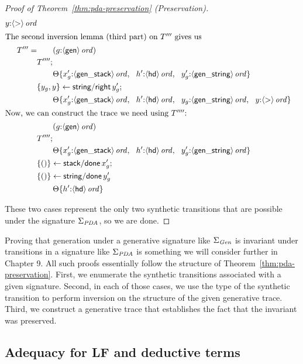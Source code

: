 \begin{proof}[Proof of Theorem~\ref{thm:pda-preservation} (Preservation)]
\begin{align*}
{                   y{:}{\langle {\sf >} \rangle}\,{{\it ord}}}\\
\intertext{The second inversion lemma (third part) on $T'''$ gives us}
T''' = & \qquad ({g{:}{\langle {\sf gen} \rangle}\,{{\it ord}}})\\
& T'''';\\
& \qquad {\Theta}\{{x_g'{:}{\langle {\sf gen\_stack} \rangle}\,{{\it ord}}, ~~
                   h'{:}{\langle {\sf hd} \rangle}\,{{\it ord}}, ~~
                   y_g'{:}{\langle {\sf gen\_string} \rangle}\,{{\it ord}}}\}\\
& \{{y_g, y}\} \leftarrow {{\sf string/right}\,y_g'};\\
& \qquad {\Theta}\{{x_g'{:}{\langle {\sf gen\_stack} \rangle}\,{{\it ord}}, ~~
                   h'{:}{\langle {\sf hd} \rangle}\,{{\it ord}}, ~~
                   y_g{:}{\langle {\sf gen\_string} \rangle}\,{{\it ord}}, ~~
                   y{:}{\langle {\sf >} \rangle}\,{{\it ord}}}\}\\
\intertext{Now, we can construct the trace we need using $T''''$:}
& \qquad ({g{:}{\langle {\sf gen} \rangle}\,{{\it ord}}})\\
& T'''';\\
& \qquad {\Theta}\{{x_g'{:}{\langle {\sf gen\_stack} \rangle}\,{{\it ord}}, ~~
                   h'{:}{\langle {\sf hd} \rangle}\,{{\it ord}}, ~~
                   y_g'{:}{\langle {\sf gen\_string} \rangle}\,{{\it ord}}}\}\\
& \{{()}\} \leftarrow {{\sf stack/done}\,x_g'};\\
& \{{()}\} \leftarrow {{\sf string/done}\,y_g'}\\
& \qquad {\Theta}\{{h'{:}{\langle {\sf hd} \rangle}\,{{\it ord}}}\}
\end{align*}

\noindent
These two cases represent the only two synthetic transitions that are possible
under the signature $\Sigma_{\it PDA}$, so we are done.
\end{proof}

Proving that generation under a generative signature like $\Sigma_{\it
  Gen}$ is invariant under transitions in a signature like
$\Sigma_{\it PDA}$ is something we will consider further
in Chapter 9.  All such proofs essentially follow the structure of
Theorem~\ref{thm:pda-preservation}. First, we enumerate the synthetic
transitions associated with a given signature. Second, in each of those
cases, we use the type of the synthetic transition to perform
inversion on the structure of the given generative trace.
Third, we construct a generative
trace that establishes the fact that the invariant was preserved.

\subsection{Adequacy for LF and deductive terms}

